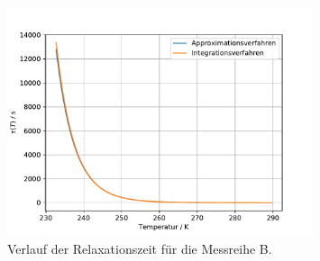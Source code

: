 \begin{figure}
    \centering
    \includegraphics[width = 0.8\textwidth , keepaspectratio]{figure/tau_verlauf_B.pdf}
    \caption{Verlauf der Relaxationszeit für die Messreihe B.}
    \label{fig:tau_verlauf_B}
\end{figure}
\clearpage